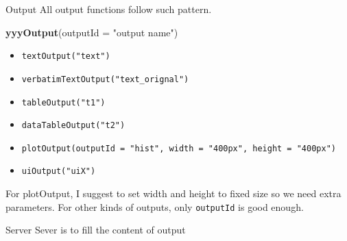 \documentclass[
  10pt,
  ignorenonframetext,
  serif]{beamer}
\newenvironment{Shaded}{\begin{snugshade}}{\end{snugshade}}
\newcommand{\CommentTok}[1]{\textcolor[rgb]{0.56,0.35,0.01}{\textit{#1}}}
\newcommand{\ControlFlowTok}[1]{\textcolor[rgb]{0.13,0.29,0.53}{\textbf{#1}}}
\newcommand{\DataTypeTok}[1]{\textcolor[rgb]{0.13,0.29,0.53}{#1}}
\newcommand{\DecValTok}[1]{\textcolor[rgb]{0.00,0.00,0.81}{#1}}
\newcommand{\KeywordTok}[1]{\textcolor[rgb]{0.13,0.29,0.53}{\textbf{#1}}}
\newcommand{\NormalTok}[1]{#1}
\newcommand{\OperatorTok}[1]{\textcolor[rgb]{0.81,0.36,0.00}{\textbf{#1}}}
\newcommand{\OtherTok}[1]{\textcolor[rgb]{0.56,0.35,0.01}{#1}}
\newcommand{\StringTok}[1]{\textcolor[rgb]{0.31,0.60,0.02}{#1}}
\providecommand{\tightlist}{%
  \setlength{\itemsep}{0pt}\setlength{\parskip}{0pt}}
\begin{document}
\begin{frame}[fragile]{Output}
\protect\hypertarget{output}{}
All output functions follow such pattern.

\begin{Shaded}
\begin{Highlighting}[]
\KeywordTok{yyyOutput}\NormalTok{(}\DataTypeTok{outputId =} \StringTok{"output name"}\NormalTok{)}
\end{Highlighting}
\end{Shaded}

\begin{itemize}
\tightlist
\item
  \texttt{textOutput("text")}
\item
  \texttt{verbatimTextOutput("text\_orignal")}
\item
  \texttt{tableOutput("t1")}
\item
  \texttt{dataTableOutput("t2")}
\item
  \texttt{plotOutput(outputId\ =\ "hist",\ width\ =\ "400px",\ height\ =\ "400px")}
\item
  \texttt{uiOutput("uiX")}
\end{itemize}

For plotOutput, I suggest to set width and height to fixed size so we
need extra parameters. For other kinds of outputs, only
\texttt{outputId} is good enough.
\end{frame}

\begin{frame}[fragile]{Server}
\protect\hypertarget{server}{}
Sever is to fill the content of output

\begin{Shaded}
\end{Shaded}
\end{frame}
\end{document}
